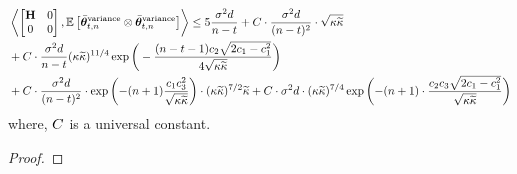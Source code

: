 \begin{lemma}\label{lem:bound-variance}
\iffalse
	\begin{align*}
	&\iprod{\begin{bmatrix}
		\Cov & \zero \\ \zero & \zero
		\end{bmatrix}}{\E{\thetavb^{\textrm{variance}} \otimes \thetavb^{\text{variance}}}}\leq 5\frac{\sigma^2d}{n-t} + 6912\cdot\sigma^2d\cdot\frac{(\cnH\cnS)^{7/4}}{\cthree\cfour(\cone\cthree)^{3/2}}\exp^{-(n+1)\cdot\frac{\ctwo\cthree\sqrt{2\cone-\cone^2}}{\sqrt{\cnH\cnS}}}\\ &+ 4\cdot\frac{\sigma^2 d}{(n-t)^2} \cdot\bigg(\ \frac{2}{\cfour}\cdot\bigg(1+\big(\frac{1+\sqrt{\cone\cfour}}{1-\cfour}\big)^2\bigg) + 3 \cdot \frac{1+\sqrt{\cone\cfour}}{1-\cfour} \cdot \frac{1+\sqrt{2}+\sqrt{\cfour/\cone}}{\cfour} \cdot (\sqrt{2}+\sqrt{\cfour/\cone}) \ \bigg)\sqrt{\cnH\cnS} \\ &+ 41472\frac{\sigma^2d}{n-t}(\cnH\cnS)^{11/4}\alpha^{(n-t-1)/2}\frac{1}{\cthree\cfour^2(\cone\cthree)^{3/2}} + 41472\cdot\frac{\sigma^2d}{(n-t)^2}\cdot\frac{1}{\cfour^2(\cone\cthree^2)^3}\cdot\exp\bigg({-(n+1)\frac{\cone\cthree^2}{\sqrt{\cnH\cnS}}}\bigg)\cdot(\cnH\cnS)^{7/2}\cnS
	\end{align*}
	\fi
		\begin{align*}
	&\iprod{\begin{bmatrix}
		\Cov & \zero \\ \zero & \zero
		\end{bmatrix}}{\E{\thetavb^{\textrm{variance}} \otimes \thetavb^{\text{variance}}}}\leq 5\frac{\sigma^2d}{n-t} +\UC\cdot\frac{\sigma^2 d}{(n-t)^2} \cdot\sqrt{\cnH\cnS}  \\ &+  \UC\cdot\frac{\sigma^2d}{n-t}(\cnH\cnS)^{11/4}\exp\bigg(-\frac{(n-t-1)\ctwo\sqrt{2\cone-\cone^2}}{4\sqrt{\cnH\cnS}}\bigg) \\&+ \UC\cdot\frac{\sigma^2d}{(n-t)^2}\cdot\exp\bigg({-(n+1)\frac{\cone\cthree^2}{\sqrt{\cnH\cnS}}}\bigg)\cdot(\cnH\cnS)^{7/2}\cnS+\UC\cdot\sigma^2d\cdot(\cnH\cnS)^{7/4}\exp\bigg({-(n+1)\cdot\frac{\ctwo\cthree\sqrt{2\cone-\cone^2}}{\sqrt{\cnH\cnS}}}\bigg)%
	\end{align*}
	where, $C$ is a universal constant.
\end{lemma}
\begin{proof}

\end{proof}


